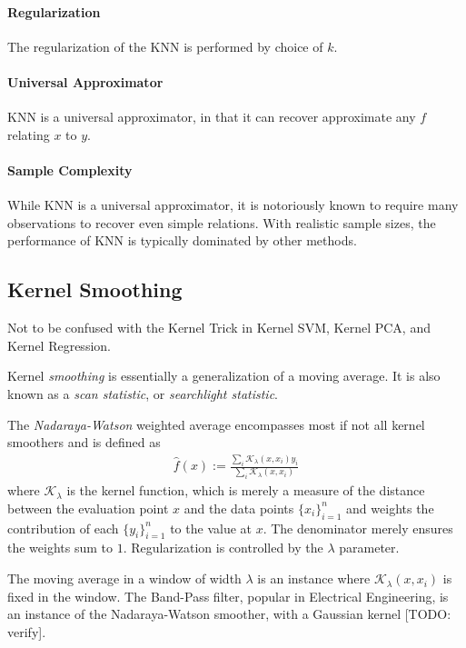 \documentclass[12pt,a4paper]{article}
\theoremstyle{plain}
\theoremstyle{definition}
\newcommand{\hyp}{f}
\newcommand{\kernel}{\mathcal{K}}
\begin{document}
\paragraph{Regularization}
The regularization of the KNN is performed by choice of $k$.

\paragraph{Universal Approximator}
KNN is a universal approximator, in that it can recover approximate any $\hyp$ relating $x$ to $y$.

\paragraph{Sample Complexity}
While KNN is a universal approximator, it is notoriously known to require many observations to recover even simple relations. With realistic sample sizes, the performance of KNN is typically dominated by other methods.




\subsection{Kernel Smoothing}
\label{sec:kernel}

Not to be confused with the Kernel Trick in Kernel SVM, Kernel PCA, and Kernel Regression.

Kernel \emph{smoothing} is essentially a generalization of a moving average.
It is also known as a \emph{scan statistic}, or \emph{searchlight statistic}.

The \emph{Nadaraya-Watson} weighted average encompasses most if not all kernel smoothers and is defined as 
\begin{align}
\label{eq:nadaraya_watson}
	\hat{\hyp}(x):= \frac{\sum_i \kernel_\lambda(x,x_i)y_i}{\sum_i \kernel_\lambda(x,x_i)}
\end{align}
where $\kernel_\lambda$ is the kernel function, which is merely a measure of the distance between the evaluation point $x$ and the data points $\{ x_i \}_{i=1}^n$ and weights the contribution of each $\{ y_i \}_{i=1}^n$ to the value at $x$.
The denominator merely ensures the weights sum to $1$.
Regularization is controlled by the $\lambda$ parameter.

The moving average in a window of width $\lambda$ is an instance where $\kernel_\lambda(x,x_i)$ is fixed in the window.
The Band-Pass filter, popular in Electrical Engineering, is an instance of the Nadaraya-Watson smoother, with a Gaussian kernel [TODO: verify].
\end{document}
